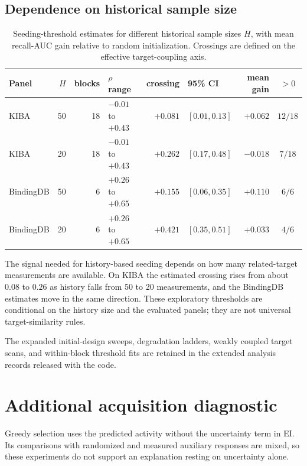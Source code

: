 \documentclass[10pt]{article}
\begin{document}
\subsection{Dependence on historical sample size}
\label{sec:res-panel}

\begin{table}[htbp]
\centering\small
\begin{tabular}{lrrlrlrc}
\toprule
Panel & $H$ & blocks & $\rho$ range & crossing & 95\% CI & mean gain & $>0$ \\
\midrule
KIBA      & 50 & 18 & $-0.01$ to $+0.43$ & $+0.081$ & $[0.01, 0.13]$ & $+0.062$ & $12/18$ \\
KIBA      & 20 & 18 & $-0.01$ to $+0.43$ & $+0.262$ & $[0.17, 0.48]$ & $-0.018$ & $7/18$ \\
BindingDB & 50 & 6  & $+0.26$ to $+0.65$ & $+0.155$ & $[0.06, 0.35]$ & $+0.110$ & $6/6$ \\
BindingDB & 20 & 6  & $+0.26$ to $+0.65$ & $+0.421$ & $[0.35, 0.51]$ & $+0.033$ & $4/6$ \\
\bottomrule
\end{tabular}
\caption{Seeding-threshold estimates for different historical sample sizes
$H$, with mean recall-AUC gain relative to random initialization. Crossings
are defined on the effective target-coupling axis.}
\label{tab:panel}
\end{table}

The signal needed for history-based seeding depends on how many
related-target measurements are available. On KIBA the estimated crossing
rises from about $0.08$ to $0.26$ as history falls from 50 to 20
measurements, and the BindingDB estimates move in the same direction. These
exploratory thresholds are conditional on the history size and the evaluated
panels; they are not universal target-similarity rules.

The expanded initial-design sweeps, degradation ladders, weakly coupled
target scans, and within-block threshold fits are retained in the extended
analysis records released with the code.

\section{Additional acquisition diagnostic}
\label{app:acquisition}

Greedy selection uses the predicted activity without the uncertainty term in
EI. Its comparisons with randomized and measured auxiliary responses are
mixed, so these experiments do not support an explanation resting on
uncertainty alone.
\end{document}
